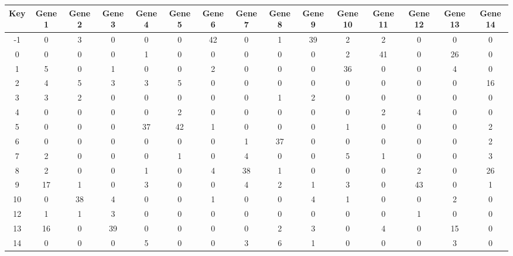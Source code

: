 \begin{tabular}{|c|c|c|c|c|c|c|c|c|c|c|c|c|c|c|}
\hline
Key & Gene 1 & Gene 2 & Gene 3 & Gene 4 & Gene 5 & Gene 6 & Gene 7 & Gene 8 & Gene 9 & Gene 10 & Gene 11 & Gene 12 & Gene 13 & Gene 14 \\
\hline
-1 & 0 & 3 & 0 & 0 & 0 & 42 & 0 & 1 & 39 & 2 & 2 & 0 & 0 & 0 \\
0 & 0 & 0 & 0 & 1 & 0 & 0 & 0 & 0 & 0 & 2 & 41 & 0 & 26 & 0 \\
1 & 5 & 0 & 1 & 0 & 0 & 2 & 0 & 0 & 0 & 36 & 0 & 0 & 4 & 0 \\
2 & 4 & 5 & 3 & 3 & 5 & 0 & 0 & 0 & 0 & 0 & 0 & 0 & 0 & 16 \\
3 & 3 & 2 & 0 & 0 & 0 & 0 & 0 & 1 & 2 & 0 & 0 & 0 & 0 & 0 \\
4 & 0 & 0 & 0 & 0 & 2 & 0 & 0 & 0 & 0 & 0 & 2 & 4 & 0 & 0 \\
5 & 0 & 0 & 0 & 37 & 42 & 1 & 0 & 0 & 0 & 1 & 0 & 0 & 0 & 2 \\
6 & 0 & 0 & 0 & 0 & 0 & 0 & 1 & 37 & 0 & 0 & 0 & 0 & 0 & 2 \\
7 & 2 & 0 & 0 & 0 & 1 & 0 & 4 & 0 & 0 & 5 & 1 & 0 & 0 & 3 \\
8 & 2 & 0 & 0 & 1 & 0 & 4 & 38 & 1 & 0 & 0 & 0 & 2 & 0 & 26 \\
9 & 17 & 1 & 0 & 3 & 0 & 0 & 4 & 2 & 1 & 3 & 0 & 43 & 0 & 1 \\
10 & 0 & 38 & 4 & 0 & 0 & 1 & 0 & 0 & 4 & 1 & 0 & 0 & 2 & 0 \\
12 & 1 & 1 & 3 & 0 & 0 & 0 & 0 & 0 & 0 & 0 & 0 & 1 & 0 & 0 \\
13 & 16 & 0 & 39 & 0 & 0 & 0 & 0 & 2 & 3 & 0 & 4 & 0 & 15 & 0 \\
14 & 0 & 0 & 0 & 5 & 0 & 0 & 3 & 6 & 1 & 0 & 0 & 0 & 3 & 0 \\
\hline
\end{tabular}